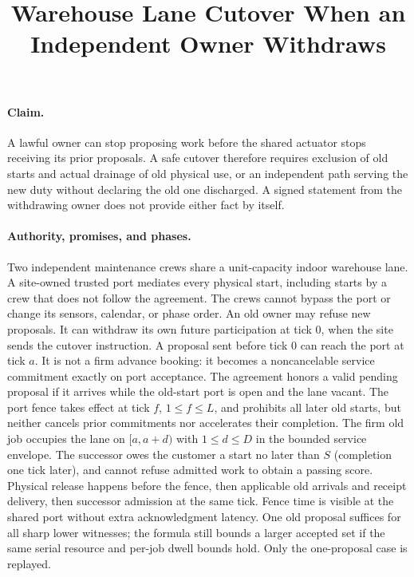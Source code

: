 \documentclass[11pt]{article}
\title{Warehouse Lane Cutover When an Independent Owner Withdraws}
\date{}
\begin{document}
\maketitle

\paragraph{Claim.}
A lawful owner can stop proposing work before the shared actuator stops receiving its prior proposals. A safe cutover therefore requires exclusion of old starts and actual drainage of old physical use, or an independent path serving the new duty without declaring the old one discharged. A signed statement from the withdrawing owner does not provide either fact by itself.

\paragraph{Authority, promises, and phases.}
Two independent maintenance crews share a unit-capacity indoor warehouse lane. A site-owned trusted port mediates every physical start, including starts by a crew that does not follow the agreement. The crews cannot bypass the port or change its sensors, calendar, or phase order. An old owner may refuse new proposals. It can withdraw its own future participation at tick 0, when the site sends the cutover instruction. A proposal sent before tick 0 can reach the port at tick $a$. It is not a firm advance booking: it becomes a noncancelable service commitment exactly on port acceptance. The agreement honors a valid pending proposal if it arrives while the old-start port is open and the lane vacant. The port fence takes effect at tick $f$, $1\le f\le L$, and prohibits all later old starts, but neither cancels prior commitments nor accelerates their completion. The firm old job occupies the lane on $[a,a+d)$ with $1\le d\le D$ in the bounded service envelope. The successor owes the customer a start no later than $S$ (completion one tick later), and cannot refuse admitted work to obtain a passing score. Physical release happens before the fence, then applicable old arrivals and receipt delivery, then successor admission at the same tick. Fence time is visible at the shared port without extra acknowledgment latency. One old proposal suffices for all sharp lower witnesses; the formula still bounds a larger accepted set if the same serial resource and per-job dwell bounds hold. Only the one-proposal case is replayed.
\end{document}
